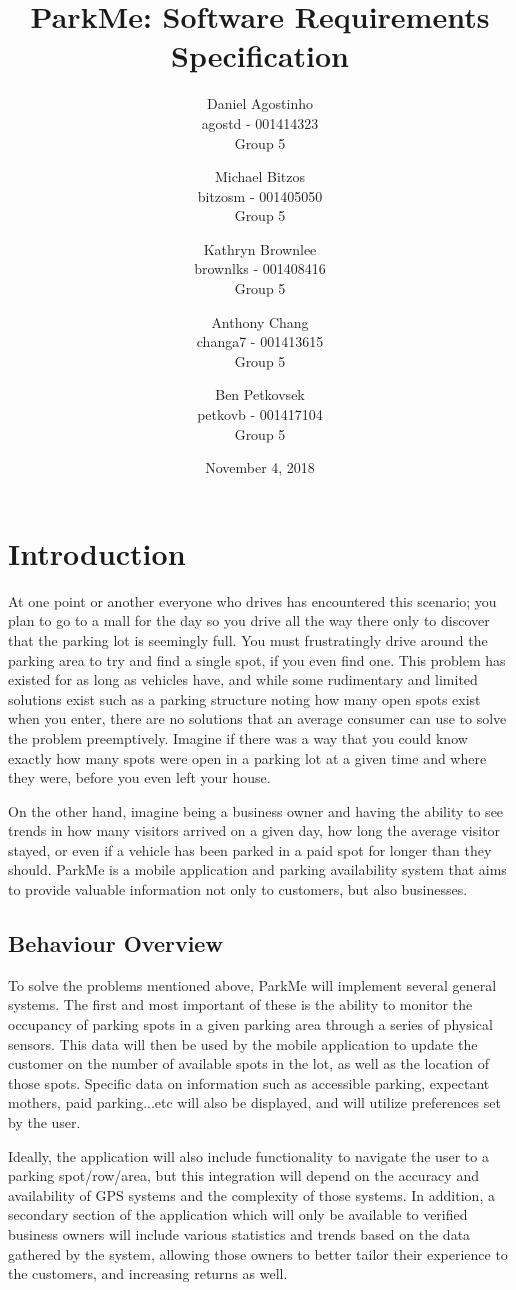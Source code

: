 \documentclass[]{article}
\title{ParkMe: Software Requirements Specification}
\author{Daniel Agostinho\\agostd - 001414323\\ Group 5 \and Michael Bitzos\\bitzosm - 001405050\\ Group 5 \and Kathryn Brownlee\\brownlks - 001408416\\ Group 5  \and Anthony Chang\\changa7 - 001413615\\ Group 5 \and Ben Petkovsek\\petkovb - 001417104\\ Group 5}
\begin{document}
\date{November 4, 2018}
\maketitle
\newpage
\tableofcontents
\newpage

\section{Introduction}
At one point or another everyone who drives has encountered this scenario; you plan to go to a mall for the day so you drive all the way there only to discover that the parking lot is seemingly full. You must frustratingly drive around the parking area to try and find a single spot, if you even find one. This problem has existed for as long as vehicles have, and while some rudimentary and limited solutions exist such as a parking structure noting how many open spots exist when you enter, there are no solutions that an average consumer can use to solve the problem preemptively. Imagine if there was a way that you could know exactly how many spots were open in a parking lot at a given time and where they were, before you even left your house. 

On the other hand, imagine being a business owner and having the ability to see trends in how many visitors arrived on a given day, how long the average visitor stayed, or even if a vehicle has been parked in a paid spot for longer than they should. ParkMe is a mobile application and parking availability system that aims to provide valuable information not only to customers, but also businesses.


\subsection{Behaviour Overview}
To solve the problems mentioned above, ParkMe will implement several general systems. The first and most important of these is the ability to monitor the occupancy of parking spots in a given parking area through a series of physical sensors. This data will then be used by the mobile application to update the customer on the number of available spots in the lot, as well as the location of those spots. Specific data on information such as accessible parking, expectant mothers, paid parking...etc will also be displayed, and will utilize preferences set by the user. 

Ideally, the application will also include functionality to navigate the user to a parking spot/row/area, but this integration will depend on the accuracy and availability of GPS systems and the complexity of those systems. In addition, a secondary section of the application which will only be available to verified business owners will include various statistics and trends based on the data gathered by the system, allowing those owners to better tailor their experience to the customers, and increasing returns as well.
\end{document}

